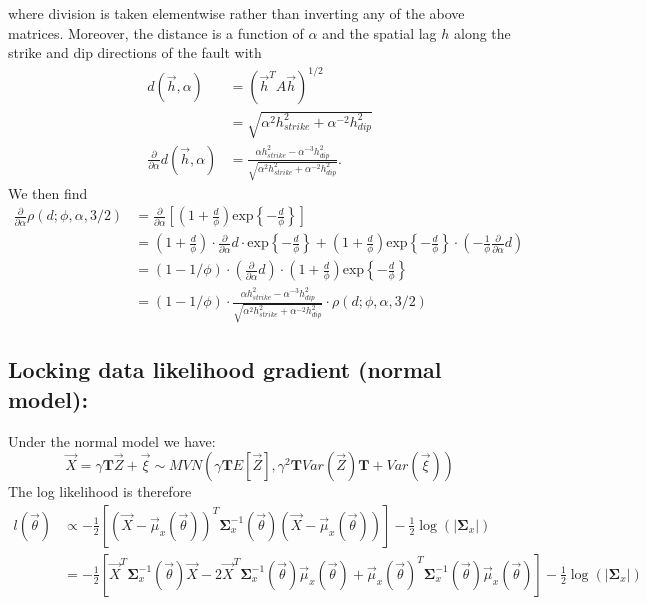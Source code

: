 {where division is taken elementwise rather than inverting any of the above matrices. Moreover, the distance is a function of $\alpha $ and the spatial lag $h$ along the strike and dip directions of the fault with
\begin{align*}
d(\vec{h}, \alpha ) &=  (\vec{h}^T A \vec{h})^{1 / 2} \\
&= \sqrt{\alpha^2 h_{strike}^2 + \alpha^{-2} h_{dip}^2} \\
\frac{\partial}{\partial \alpha } d(\vec{h}, \alpha )&= \frac{\alpha h_{strike}^2 - \alpha ^{-3} h_{dip}^2}{\sqrt{\alpha^2 h_{strike}^2 + \alpha^{-2} h_{dip}^2}}.
\end{align*}
We then find 
\begin{align*}
\frac{\partial}{\partial \alpha } \rho(d; \phi, \alpha , 3/2) &= \frac{\partial}{\partial \alpha } \left [\left( 1 + \frac{d}{\phi} \right) \text{exp} \left\{ -\frac{d}{\phi} \right \} \right ] \\
&= \left( 1 + \frac{d}{\phi} \right) \cdot \frac{\partial}{\partial \alpha }d \cdot \text{exp} \left\{ -\frac{d}{\phi} \right \}  + \left( 1 + \frac{d}{\phi} \right) \text{exp} \left\{ -\frac{d}{\phi} \right \} \cdot \left ( -\frac{1}{\phi } \frac{\partial}{\partial \alpha } d \right ) \\
&= ( 1 - 1 / \phi ) \cdot \left (\frac{\partial}{\partial \alpha } d \right ) \cdot \left( 1 + \frac{d}{\phi} \right) \text{exp} \left\{ -\frac{d}{\phi} \right \} \\
&= ( 1 - 1 / \phi ) \cdot  \frac{\alpha h_{strike}^2 - \alpha ^{-3} h_{dip}^2}{\sqrt{\alpha^2 h_{strike}^2 + \alpha^{-2} h_{dip}^2}} \cdot \rho(d; \phi, \alpha , 3/2) 
\end{align*}

\subsection*{Locking data likelihood gradient (normal model):}

Under the normal model we have:
$$ \vec{X} = \gamma \mathbf{T} \vec{Z} + \vec{\xi} \sim MVN \left(\gamma \mathbf{T} E\left[ \vec{Z} \right], \gamma^2 \mathbf{T} Var\left(\vec{Z}\right) \mathbf{T} + Var(\vec{\xi})\right) $$
The log likelihood is therefore
\begin{align*}
l(\vec{\theta}) &\propto -\frac{1}{2} \left [ (\vec{X} - \vec{\mu}_x(\vec{\theta}))^T \mathbf{\Sigma}_x^{-1}(\vec{\theta}) (\vec{X} - \vec{\mu}_x(\vec{\theta})) \right ] - \frac{1}{2}\log(|\mathbf{\Sigma}_x|)\\
&= -\frac{1}{2} \left [ \vec{X}^T \mathbf{\Sigma}_x^{-1}(\vec{\theta}) \vec{X} - 2 \vec{X}^T \mathbf{\Sigma}_x^{-1}(\vec{\theta}) \vec{\mu}_x(\vec{\theta}) + \vec{\mu}_x(\vec{\theta})^T \mathbf{\Sigma}_x^{-1}(\vec{\theta}) \vec{\mu}_x(\vec{\theta}) \right ] - \frac{1}{2}\log(|\mathbf{\Sigma}_x|)
\end{align*}

}
